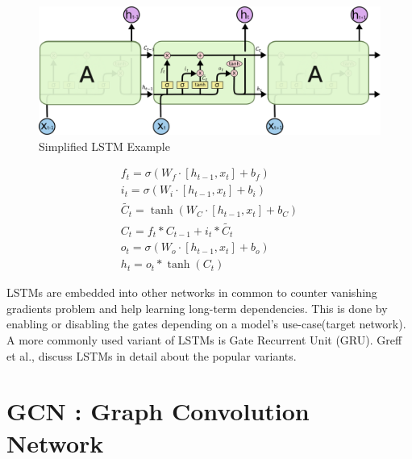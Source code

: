 \begin{figure}[h!]
	\centering
	\includegraphics[scale=0.40]{figures/LSTMARCH.PNG}
	\caption{Simplified LSTM Example \cite{colah}}
	\label{fig:lstmsim}
\end{figure}

\begin{subequations}
	\label{eq1}
	\begin{align}
		\displaystyle f_t =\sigma \left(W_f \cdot\left[h_{t-1},x_t\right] + b_f\right) \label{equ:one} \\
		\displaystyle i_t =\sigma \left(W_i \cdot\left[h_{t-1},x_t\right] + b_i\right) \label{equ:two} \\
		\displaystyle \widetilde{C_t} = \tanh \left(W_C \cdot \left[h_{t-1},x_t\right] + b_C\right) \label{equ:three} \\
		\displaystyle C_t = f_t * C_{t-1} + i_t * \widetilde{C_t} \label{equ:four} \\
		\displaystyle o_t =\sigma \left(W_o \cdot\left[h_{t-1},x_t\right] + b_o\right) \label{equ:five} \\
		\displaystyle h_t = o_t * \tanh \left(C_t\right) \label{equ:six}
	\end{align}
\end{subequations}
\newpar





\newpar
LSTMs are embedded into other networks in common to counter vanishing gradients problem and help learning long-term dependencies. This is done by enabling or disabling the gates depending on a model's use-case(target network). A more commonly used variant of LSTMs is Gate Recurrent Unit (GRU). Greff et al.,\cite{greff2016lstm} discuss LSTMs in detail about the popular variants.

\section{GCN : Graph Convolution Network}

